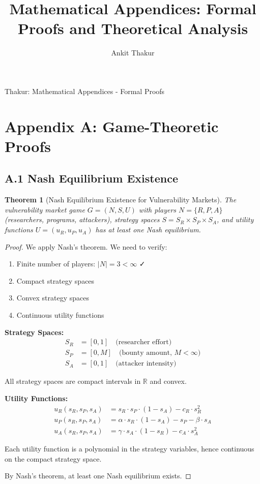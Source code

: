 \documentclass[journal]{IEEEtran}
\newtheorem{theorem}{Theorem}
\begin{document}
\title{Mathematical Appendices: Formal Proofs and Theoretical Analysis}

\author{Ankit Thakur}

%
{Thakur: Mathematical Appendices - Formal Proofs}

\maketitle

\section{Appendix A: Game-Theoretic Proofs}

\subsection{A.1 Nash Equilibrium Existence}

\begin{theorem}[Nash Equilibrium Existence for Vulnerability Markets]
The vulnerability market game $G = (N, S, U)$ with players $N = \{R, P, A\}$ (researchers, programs, attackers), strategy spaces $S = S_R \times S_P \times S_A$, and utility functions $U = (u_R, u_P, u_A)$ has at least one Nash equilibrium.
\end{theorem}

\begin{proof}
We apply Nash's theorem. We need to verify:
\begin{enumerate}
\item Finite number of players: $|N| = 3 < \infty$ ✓
\item Compact strategy spaces
\item Convex strategy spaces
\item Continuous utility functions
\end{enumerate}

\textbf{Strategy Spaces:}
\begin{align}
S_R &= [0,1] \quad \text{(researcher effort)} \\
S_P &= [0, M] \quad \text{(bounty amount, } M < \infty \text{)} \\
S_A &= [0,1] \quad \text{(attacker intensity)}
\end{align}

All strategy spaces are compact intervals in $\mathbb{R}$ and convex.

\textbf{Utility Functions:}
\begin{align}
u_R(s_R, s_P, s_A) &= s_R \cdot s_P \cdot (1 - s_A) - c_R \cdot s_R^2 \\
u_P(s_R, s_P, s_A) &= \alpha \cdot s_R \cdot (1 - s_A) - s_P - \beta \cdot s_A \\
u_A(s_R, s_P, s_A) &= \gamma \cdot s_A \cdot (1 - s_R) - c_A \cdot s_A^2
\end{align}

Each utility function is a polynomial in the strategy variables, hence continuous on the compact strategy space.

By Nash's theorem, at least one Nash equilibrium exists.
\end{proof}
\end{document}
